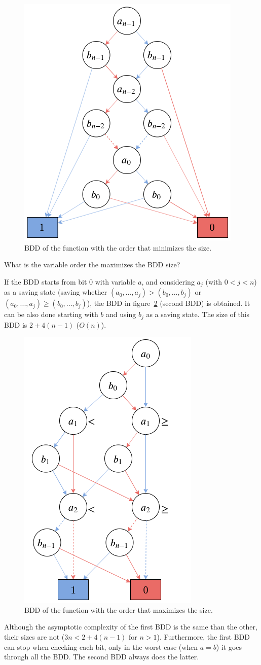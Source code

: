 \documentclass[a4paper, 10pt]{article}
\begin{document}
\begin{figure}[htbp]
    \centering
    \includegraphics[width=0.35\linewidth]{min_bdd.png}
    \caption{BDD of the function with the order that minimizes the size.}
    \label{fig:min_bdd}
\end{figure}

{\color{statement} What is the variable order the maximizes the BDD size?}

If the BDD starts from bit $0$ with variable $a$, and considering $a_j$ (with $0 < j < n$) as a saving state (saving whether $(a_{0},...,a_{j}) > (b_{0},...,b_{j})$ or $(a_{0},...,a_{j}) \geq (b_{0},...,b_{j})$), the BDD in figure~\ref{fig:max_bdd} (second BDD) is obtained. It can be also done starting with $b$ and using $b_j$ as a saving state. The size of this BDD is $2+4(n-1)$ ($O(n)$).
\begin{figure}[htbp]
    \centering
    \includegraphics[width=0.3\linewidth]{max_bdd.png}
    \caption{BDD of the function with the order that maximizes the size.}
    \label{fig:max_bdd}
\end{figure}

Although the asymptotic complexity of the first BDD is the same than the other, their sizes are not ($3n < 2+4(n-1)$ for $n>1$). Furthermore, the first BDD can stop when checking each bit, only in the worst case (when $a = b$) it goes through all the BDD. The second BDD always does the latter.
\end{document}
